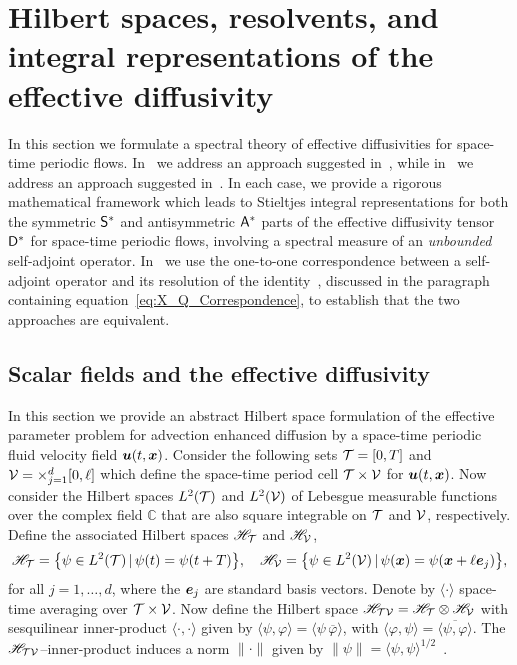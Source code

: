 \documentclass[amsa]{ipart}
\begin{document}
\section{Hilbert spaces, resolvents, and integral representations of the effective diffusivity}
\label{sec:Hilbert_Resolvent_Integral_Reps} 
%
In this section we formulate a spectral theory of effective
diffusivities for space-time periodic
flows. In~ we address an approach suggested
in~\cite{Pavliotis:PHD_Thesis}, while in~
we address an approach suggested in~\cite{Avellaneda:PRE:3249}. In 
each case, we provide a rigorous mathematical framework which leads to
Stieltjes integral representations for both the symmetric $\mathsf{S}^*$ and
antisymmetric $\mathsf{A}^*$ parts of the effective diffusivity tensor
$\mathsf{D}^*$ for space-time periodic
flows, involving a spectral measure of an \emph{unbounded}
self-adjoint operator. In~ we use
the one-to-one correspondence between a self-adjoint operator and its
resolution of the identity~\cite{Stone:64}, discussed in the paragraph
containing equation~\eqref{eq:X_Q_Correspondence}, to establish that
the two approaches are equivalent.  



\subsection{Scalar fields and the effective diffusivity}\label{sec:Scalar_Fields}
%
In this section we provide an abstract Hilbert space formulation of
the effective parameter problem for advection enhanced diffusion by a
space-time periodic fluid velocity field $\boldsymbol{u}(t,\boldsymbol{x})$. Consider
the following sets $\mathcal{T}=[0,T]$ and $\mathcal{V}=\times_{j=1}^d[0,\ell]$ which 
define the space-time period cell $\mathcal{T}\times\mathcal{V}$ for $\boldsymbol{u}(t,\boldsymbol{x})$. Now
consider the Hilbert spaces $L^2(\mathcal{T})$ and $L^2(\mathcal{V})$ of Lebesgue measurable
functions over the complex field $\mathbb{C}$ that are also square
integrable on $\mathcal{T}$ and $\mathcal{V}$, respectively. Define the associated
Hilbert spaces $\mathscr{H}_{\mathcal{T}}$ and $\mathscr{H}_{\mathcal{V}}$,
%
\begin{align}\label{eq:Hilbert_Spaces_scalar}
  \Hs_{\Tc}=\big\{\psi\in L^2(\Tc) \, | \, \psi(t)=\psi(t+T)\big\}, \quad
  \Hs_{\Vc}=\big\{\psi\in L^2(\Vc) \, | \, \psi(\vecx)=\psi(\vecx+\ell\vece_j)\big\},  
\end{align}
%
for all $j=1,\ldots,d$, where the $\boldsymbol{e}_j$ are standard basis vectors. Denote by 
$\langle\cdot\rangle$ space-time averaging over $\mathcal{T}\times\mathcal{V}$. Now define the Hilbert space 
$\mathscr{H}_{\mathcal{T}\mathcal{V}}=\mathscr{H}_{\mathcal{T}}\otimes\mathscr{H}_{\mathcal{V}}$ with sesquilinear
inner-product $\langle\cdot,\cdot\rangle$ given by $\langle\psi,\varphi\rangle=\langle\psi\,\overline{\varphi}\rangle$, with
$\langle\varphi,\psi\rangle=\overline{\langle\psi,\varphi\rangle}$. The $\mathscr{H}_{\mathcal{T}\mathcal{V}}$--inner-product induces a
norm $\|\cdot\|$ given by  $\|\psi\|=\langle\psi,\psi\rangle^{1/2}$~\cite{Folland:99:RealAnalysis}. 
\end{document}
